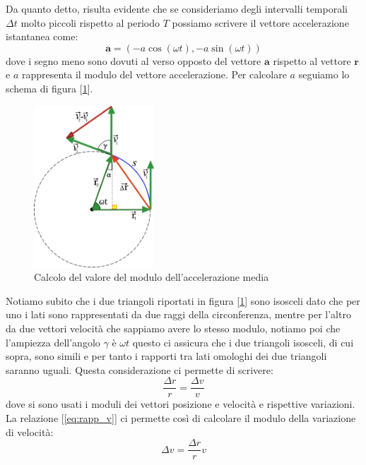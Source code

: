 \documentclass[a4paper,10pt,oneside]{article}
\begin{document}
Da quanto detto, risulta evidente che se consideriamo degli intervalli temporali $\Delta t$ molto piccoli rispetto al periodo $T$ possiamo scrivere il vettore accelerazione istantanea come:
\begin{equation}
 \mathbf{a}=\left(-a\cos(\omega t),-a\sin(\omega t)\right)
\end{equation}
dove i segno meno sono dovuti al verso opposto del vettore $\mathbf{a}$ rispetto al vettore $\mathbf{r}$ e $a$ rappresenta il modulo del vettore accelerazione. Per calcolare $a$ seguiamo lo schema di figura [\ref{fig:cal_acc}].
\begin{figure}[H]
 \centering
 \includegraphics[width=0.4\textwidth]{./immagini/vet_acc_calc.png}
 \caption{Calcolo del valore del modulo dell'accelerazione media}
 \label{fig:cal_acc}
\end{figure}
Notiamo subito che i due triangoli riportati in figura [\ref{fig:cal_acc}] sono isosceli dato che per uno i lati sono rappresentati da due raggi della circonferenza, mentre per l'altro da due vettori velocità che sappiamo avere lo stesso modulo, notiamo poi che l'ampiezza dell'angolo $\gamma$ è $\omega t$ questo ci assicura che i due triangoli isosceli, di cui sopra, sono simili e per tanto i rapporti tra lati omologhi dei due triangoli saranno uguali. Questa considerazione ci permette di scrivere:
\begin{equation}\label{eq:rapp_v}
 \frac{\Delta r}{r}=\frac{\Delta v}{ v}
\end{equation}
dove si sono usati i moduli dei vettori posizione e velocità e rispettive variazioni.
La relazione [\ref{eq:rapp_v}] ci permette così di calcolare il modulo della variazione di velocità:
\begin{equation}
 \Delta v=\frac{\Delta r}{r}v
\end{equation}
\end{document}
